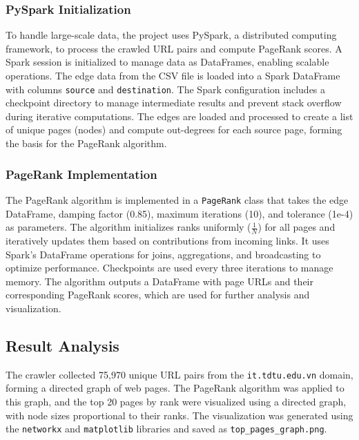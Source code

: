 \subsubsection{PySpark Initialization}\text{}

To handle large-scale data, the project uses PySpark, a distributed computing framework, to process the crawled URL pairs and compute PageRank scores.
A Spark session is initialized to manage data as DataFrames, enabling scalable operations.
The edge data from the CSV file is loaded into a Spark DataFrame with columns \texttt{source} and \texttt{destination}.
The Spark configuration includes a checkpoint directory to manage intermediate results and prevent stack overflow during iterative computations.
The edges are loaded and processed to create a list of unique pages (nodes) and compute out-degrees for each source page, forming the basis for the PageRank algorithm.

\subsubsection{PageRank Implementation}\text{}

The PageRank algorithm is implemented in a \texttt{PageRank} class that takes the edge DataFrame, damping factor (0.85), maximum iterations (10), and tolerance (1e-4) as parameters.
The algorithm initializes ranks uniformly ($\frac{1}{N}$) for all pages and iteratively updates them based on contributions from incoming links.
It uses Spark's DataFrame operations for joins, aggregations, and broadcasting to optimize performance.
Checkpoints are used every three iterations to manage memory.
The algorithm outputs a DataFrame with page URLs and their corresponding PageRank scores, which are used for further analysis and visualization.

\subsection{Result Analysis}
\label{subsec:result-analysis}

The crawler collected 75,970 unique URL pairs from the \texttt{it.tdtu.edu.vn} domain, forming a directed graph of web pages.
The PageRank algorithm was applied to this graph, and the top 20 pages by rank were visualized using a directed graph, with node sizes proportional to their ranks.
The visualization was generated using the \texttt{networkx} and \texttt{matplotlib} libraries and saved as \texttt{top\_pages\_graph.png}.

